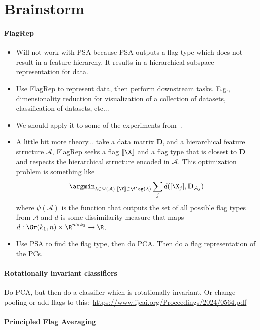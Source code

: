 \section{Brainstorm}


\paragraph{FlagRep}
\begin{itemize}
    \item Will not work with PSA because PSA outputs a flag type which does not result in a feature hierarchy. It results in a hierarchical subspace representation for data.
    \item  Use FlagRep to represent data, then perform downstream tasks. E.g., dimensionality reduction for visualization of a collection of datasets, classification of datasets, etc...
    \item We should apply it to some of the experiments from~\cite{mankovich2022flag,mankovich2023subspace}.
    \item A little bit more theory... take a data matrix $\mathbf{D}$, and a hierarchical feature structure $\mathcal{A}$, FlagRep seeks a flag $[\![\X]\!]$ and a flag type that is closest to $\mathbf{D}$ and respects the hierarchical structure encoded in $\mathcal{A}$. This optimization problem is something like
    \begin{equation}
        \argmin_{\lambda \in \Psi(\mathcal{A}), [\![\X]\!] \in \flag(\lambda)} \sum_{j} d([\X_j],\mathbf{D}_{\mathcal{A}_j}) 
    \end{equation}
    where $\psi(\mathcal{A})$ is the function that outputs the set of all possible flag types from $\mathcal{A}$ and $d$ is some dissimilarity measure that maps $d:\Gr(k_1,n)\times \R^{n \times k_2}\rightarrow \R$.
    \item Use PSA to find the flag type, then do PCA. Then do a flag representation of the PCs.
\end{itemize}





\paragraph{Rotationally invariant classifiers}
Do PCA, but then do a classifier which is rotationally invariant.
Or change pooling or add flags to this:~\url{https://www.ijcai.org/Proceedings/2024/0564.pdf}

\paragraph{Principled Flag Averaging}

